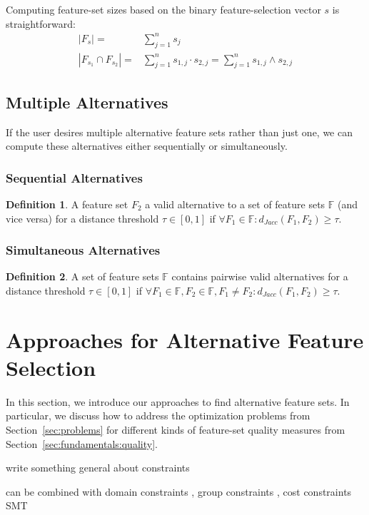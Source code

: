 \documentclass{article}
\theoremstyle{definition}
\newtheorem{definition}{Definition}
\begin{document}
Computing feature-set sizes based on the binary feature-selection vector $s$ is straightforward:
%
\begin{align}
	|F_s| =& \sum_{j=1}^n s_j\\
	|F_{s_1} \cap F_{s_2}| =& \sum_{j=1}^n s_{1,j} \cdot s_{2,j} = \sum_{j=1}^n s_{1,j} \land s_{2,j}
\end{align}
%
\subsection{Multiple Alternatives}

If the user desires multiple alternative feature sets rather than just one, we can compute these alternatives either sequentially or simultaneously.

\subsubsection{Sequential Alternatives}
%
\begin{definition}
	A feature set $F_2$ a valid alternative to a set of feature sets $\mathbb{F}$ (and vice versa) for a distance threshold $\tau \in [0,1]$ if $\forall F_1 \in \mathbb{F}: d_{Jacc}(F_1,F_2) \geq \tau$.
\end{definition}
%
\subsubsection{Simultaneous Alternatives}
%
\begin{definition}
	A set of feature sets $\mathbb{F}$ contains pairwise valid alternatives for a distance threshold $\tau \in [0,1]$ if $\forall F_1 \in \mathbb{F}, F_2 \in \mathbb{F}, F_1 \neq F_2: d_{Jacc}(F_1,F_2) \geq \tau$.
\end{definition}
%
\section{Approaches for Alternative Feature Selection}
\label{sec:approaches}

In this section, we introduce our approaches to find alternative feature sets.
In particular, we discuss how to address the optimization problems from Section~\ref{sec:problems} for different kinds of feature-set quality measures from Section~\ref{sec:fundamentals:quality}.

write something general about constraints

can be combined with domain constraints \cite{groves2015toward}, group constraints \cite{yuan2006model}, cost constraints \cite{paclik2002feature}
SMT \cite{barrett2018satisfiability}
\end{document}

